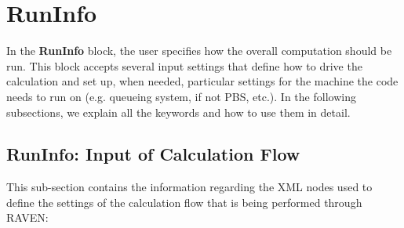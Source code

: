 \section{RunInfo}
\label{sec:RunInfo}
In the \textbf{RunInfo} block, the user specifies how the overall computation
should be run.
%
This block accepts several input settings that define how to drive the
calculation and set up, when needed, particular settings for the machine the
code needs to run on (e.g. queueing system, if not PBS, etc.).
%
In the following subsections, we explain all the keywords and how to use them in
detail.
\subsection{RunInfo: Input of Calculation Flow}
\label{subsec:runinfoCalcFlow}
This sub-section contains the information regarding the XML nodes used to define
the settings of the calculation flow that is being performed through RAVEN:

